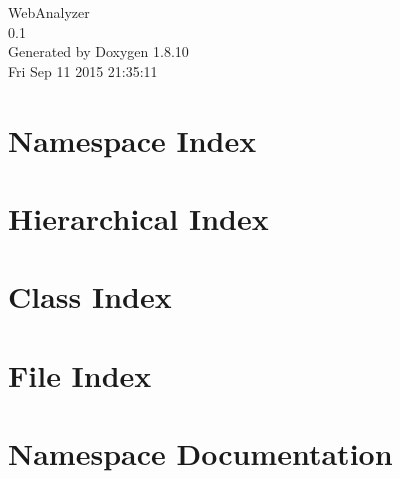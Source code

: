 \documentclass[twoside]{book}
\newcommand{\+}{\discretionary{\mbox{\scriptsize$\hookleftarrow$}}{}{}}
\newcommand{\clearemptydoublepage}{%
  \newpage{\pagestyle{empty}\cleardoublepage}%
}
\begin{document}
\hypersetup{pageanchor=false,
             bookmarks=true,
             bookmarksnumbered=true,
             pdfencoding=unicode
            }
\begin{titlepage}
\vspace*{7cm}
\begin{center}%
{\Large Web\+Analyzer \\[1ex]\large 0.\+1 }\\
\vspace*{1cm}
{\large Generated by Doxygen 1.8.10}\\
\vspace*{0.5cm}
{\small Fri Sep 11 2015 21:35:11}\\
\end{center}
\end{titlepage}
\clearemptydoublepage
\tableofcontents
\clearemptydoublepage
{}
\hypersetup{pageanchor=true}

\chapter{Namespace Index}

\chapter{Hierarchical Index}

\chapter{Class Index}

\chapter{File Index}

\chapter{Namespace Documentation}






















\end{document}
